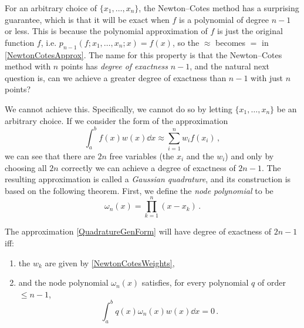 For an arbitrary choice of $\{x_1, \dots, x_n\}$, the Newton--Cotes method has a surprising guarantee, which is that it will be exact when $f$ is a polynomial of degree $n-1$ or less. This is because the polynomial approximation of $f$ is just the original function $f$, i.e. $p_{n-1}(f; x_1, \dots, x_n; x) = f(x)$, so the $\approx$ becomes $=$ in \eqref{NewtonCotesApprox}. The name for this property is that the Newton--Cotes method with $n$ points has \emph{degree of exactness} $n-1$, and the natural next question is, can we achieve a greater degree of exactness than $n-1$ with just $n$ points?

We cannot achieve this. Specifically, we cannot do so by letting $\{x_1, \dots, x_n\}$ be an arbitrary choice. If we consider the form of the approximation
\begin{equation} \label{QuadratureGenForm}
	\int_a^b f(x) w(x) \dd x \approx \sum_{i=1}^n w_i f(x_i) \,,
\end{equation}
we can see that there are $2n$ free variables (the $x_i$ and the $w_i$) and only by choosing all $2n$ correctly we can achieve a degree of exactness of $2n-1$. The resulting approximation is called a \emph{Gaussian quadrature}, and its construction is based on the following theorem. First, we define the \emph{node polynomial} to be
\begin{equation} \label{NodePolynomial}
	\omega_n(x) = \prod_{k=1}^n (x - x_k) \,.
\end{equation}

\begin{theorem} \label{thm:GaussianQuadrature}
The approximation \eqref{QuadratureGenForm} will have degree of exactness of $2n -1$ iff:
\begin{enumerate}
\item the $w_k$ are given by \eqref{NewtonCotesWeights},
\item and the node polynomial $\omega_n(x)$ satisfies, for every polynomial $q$ of order $\le n-1$,
\begin{equation} \label{NodePolynomialOrthogonal}
	\int_{a}^b q(x) \omega_n(x) w(x) \dd x = 0  \,.
\end{equation}
\end{enumerate}
\end{theorem}

